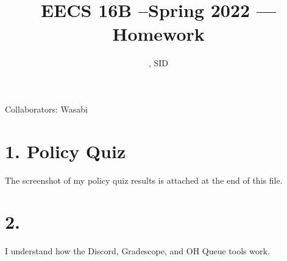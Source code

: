 \documentclass[11pt]{article}
\title{EECS 16B --Spring 2022 --- Homework \Homework}
\author{\Name, SID \SID}
\date{}
\begin{document}
\maketitle

Collaborators: Wasabi

\section*{1. Policy Quiz}
The screenshot of my policy quiz results is attached at the end of this file.

\newpage
\section*{2.}
I understand how the Discord, Gradescope, and OH Queue tools work.

\newpage
\end{document}
